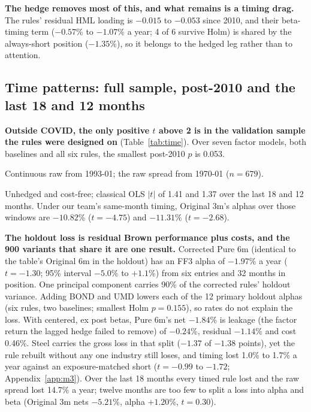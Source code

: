 \textbf{The hedge removes most of this, and what remains is a timing drag.} The rules' residual HML loading is $-0.015$ to $-0.053$ since 2010, and their \citet{ln2006} beta-timing term ($-0.57$\% to $-1.07$\% a year; 4 of 6 survive Holm) is shared by the always-short position ($-1.35$\%), so it belongs to the hedged leg rather than to attention.

\subsection{Time patterns: full sample, post-2010 and the last 18 and 12 months}
\label{sec:time}

\textbf{Outside COVID, the only positive $t$ above 2 is in the validation sample the rules were designed on} (Table~\ref{tab:time}). Over seven factor models, both baselines and all six rules, the smallest post-2010 $p$ is 0.053.

\begin{table}[!htb]
\caption{Time patterns. Annualized net return (\%) and FF3 alpha (\%, NW(6) $t$) of three corrected-baseline rules, the always-short Brown position and the raw GB spread. With $t(n-4)$ p-values, 18 and 12 months need $|t|$ above 2.14 and 2.31.}
\label{tab:time}
\centering\scriptsize
\setlength{\tabcolsep}{4.5pt}
\begin{threeparttable}

\begin{tablenotes}[flushleft]\scriptsize
\item[a] Continuous raw from 1993-01; the raw spread from 1970-01 ($n=679$). \item[b] Unhedged and cost-free; classical OLS $|t|$ of 1.41 and 1.37 over the last 18 and 12 months. Under our team's same-month timing, Original 3m's alphas over those windows are $-10.82$\% ($t=-4.75$) and $-11.31$\% ($t=-2.68$).
\end{tablenotes}
\end{threeparttable}
\end{table}

\textbf{The holdout loss is residual Brown performance plus costs, and the 900 variants that share it are one result.} Corrected Pure 6m (identical to the table's Original 6m in the holdout) has an FF3 alpha of $-1.97$\% a year ($t=-1.30$; 95\% interval $-5.0$\% to $+1.1$\%) from six entries and 32 months in position. One principal component carries 90\% of the corrected rules' holdout variance. Adding BOND and UMD lowers each of the 12 primary holdout alphas (six rules, two baselines; smallest Holm $p=0.155$), so rates do not explain the loss. With centered, ex post betas, Pure 6m's net $-1.84$\% is leakage (the factor return the lagged hedge failed to remove) of $-0.24$\%, residual $-1.14$\% and cost 0.46\%. Steel carries the gross loss in that split ($-1.37$ of $-1.38$ points), yet the rule rebuilt without any one industry still loses, and timing lost 1.0\% to 1.7\% a year against an exposure-matched short ($t=-0.99$ to $-1.72$; Appendix~\ref{app:m3}). Over the last 18 months every timed rule lost and the raw spread lost 14.7\% a year; twelve months are too few to split a loss into alpha and beta (Original 3m nets $-5.21$\%, alpha $+1.20$\%, $t=0.30$).

